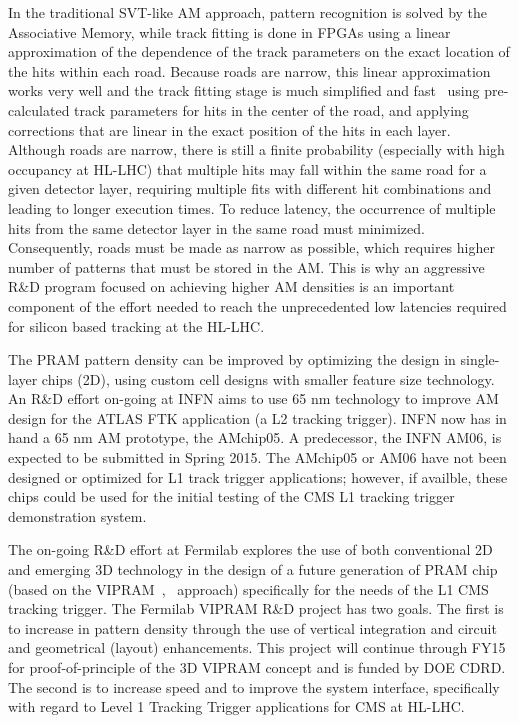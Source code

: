In the traditional SVT-like AM approach, pattern recognition is solved by the Associative Memory, while track fitting is done in FPGAs using a linear approximation of the dependence of the track parameters on the exact location of the hits within each road. Because roads are narrow, this linear approximation works very well and the track fitting stage is much simplified and fast~\cite{bib:Ann-09} using pre-calculated track parameters for hits in the center of the road, and applying corrections that are linear in the exact position of the hits in each layer. Although roads are narrow, there is still a finite probability (especially with high occupancy at HL-LHC) that multiple hits may fall within the same road for a given detector layer, requiring multiple fits with different hit combinations and leading to longer execution times. To reduce latency, the occurrence of multiple hits from the same detector layer in the same road must minimized.  Consequently, roads must be made as narrow as possible, which requires higher number of patterns that must be stored in the AM. This is why an aggressive R\&D program focused on achieving higher AM densities is an important component of the effort needed to reach the unprecedented low latencies required for silicon based tracking at the HL-LHC.

The PRAM pattern density can be improved by optimizing the design in single-layer chips (2D), using custom cell designs with smaller feature size technology. An R\&D effort on-going at INFN aims to use 65 nm technology to improve AM design for the ATLAS FTK application (a L2 tracking trigger).  INFN now has in hand a 65 nm AM prototype, the AMchip05.  A predecessor, the INFN AM06, is expected to be submitted in Spring 2015. The AMchip05 or AM06 have not been designed or optimized for L1 track trigger applications; however, if availble, these chips could be used for the initial testing of the CMS L1 tracking trigger demonstration system.

\noindent The on-going R\&D effort at Fermilab explores the use of both conventional 2D and emerging 3D technology in the design of a future generation of PRAM chip (based on the VIPRAM~\cite{bib:VIP-11},~\cite{bib:VIP-12} approach) specifically for the needs of the L1 CMS tracking trigger. The Fermilab VIPRAM R\&D project has two goals.  The first is to increase in pattern density through the use of vertical integration and circuit and geometrical (layout) enhancements. This project will continue through FY15 for proof-of-principle of the 3D VIPRAM concept and is funded by DOE CDRD. The second is to increase speed and to improve the system interface, specifically with regard to Level 1 Tracking Trigger applications for CMS at HL-LHC.


